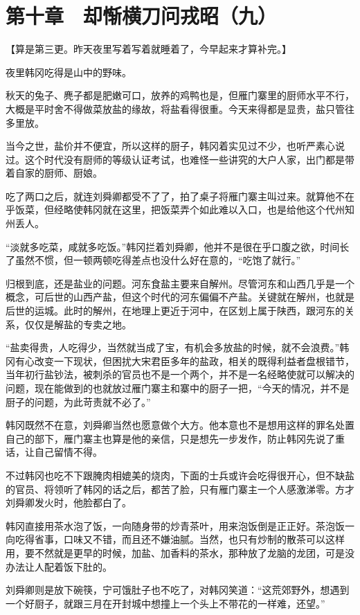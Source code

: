 \section{第十章　却惭横刀问戎昭（九）}

【算是第三更。昨天夜里写着写着就睡着了，今早起来才算补完。】

夜里韩冈吃得是山中的野味。

秋天的兔子、麂子都是肥嫩可口，放养的鸡鸭也是，但雁门寨里的厨师水平不行，大概是平时舍不得做菜放盐的缘故，将盐看得很重。今天来得都是显贵，盐只管往多里放。

当今之世，盐价并不便宜，所以这样的厨子，韩冈着实见过不少，也听严素心说过。这个时代没有厨师的等级认证考试，也难怪一些讲究的大户人家，出门都是带着自家的厨师、厨娘。

吃了两口之后，就连刘舜卿都受不了了，拍了桌子将雁门寨主叫过来。就算他不在乎饭菜，但经略使韩冈就在这里，把饭菜弄个如此难以入口，也是给他这个代州知州丢人。

“淡就多吃菜，咸就多吃饭。”韩冈拦着刘舜卿，他并不是很在乎口腹之欲，时间长了虽然不惯，但一顿两顿吃得差点也没什么好在意的，“吃饱了就行。”

归根到底，还是盐业的问题。河东食盐主要来自解州。尽管河东和山西几乎是一个概念，可后世的山西产盐，但这个时代的河东偏偏不产盐。关键就在解州，也就是后世的运城。此时的解州，在地理上更近于河中，在区划上属于陕西，跟河东的关系，仅仅是解盐的专卖之地。

“盐卖得贵，人吃得少，当然就当成了宝，有机会多放盐的时候，就不会浪费。”韩冈有心改变一下现状，但困扰大宋君臣多年的盐政，相关的既得利益者盘根错节，当年初行盐钞法，被刺杀的官员也不是一个两个，并不是一名经略使就可以解决的问题，现在能做到的也就放过雁门寨主和寨中的厨子一把，“今天的情况，并不是厨子的问题，为此苛责就不必了。”

韩冈既然不在意，刘舜卿当然也愿意做个大方。他本意也不是想用这样的罪名处置自己的部下，雁门寨主也算是他的亲信，只是想先一步发作，防止韩冈先说了重话，让自己留情不得。

不过韩冈也吃不下跟腌肉相媲美的烧肉，下面的士兵或许会吃得很开心，但不缺盐的官员、将领听了韩冈的话之后，都苦了脸，只有雁门寨主一个人感激涕零。方才刘舜卿发火时，他脸都白了。

韩冈直接用茶水泡了饭，一向随身带的炒青茶叶，用来泡饭倒是正正好。茶泡饭一向吃得省事，口味又不错，而且还不嫌油腻。当然，也只有炒制的散茶可以这样用，要不然就是更早的时候，加盐、加香料的茶水，那种放了龙脑的龙团，可是没办法让人配着饭下肚的。

刘舜卿则是放下碗筷，宁可饿肚子也不吃了，对韩冈笑道：“这荒郊野外，想遇到一个好厨子，就跟三月在开封城中想撞上一个头上不带花的一样难，还望。”

